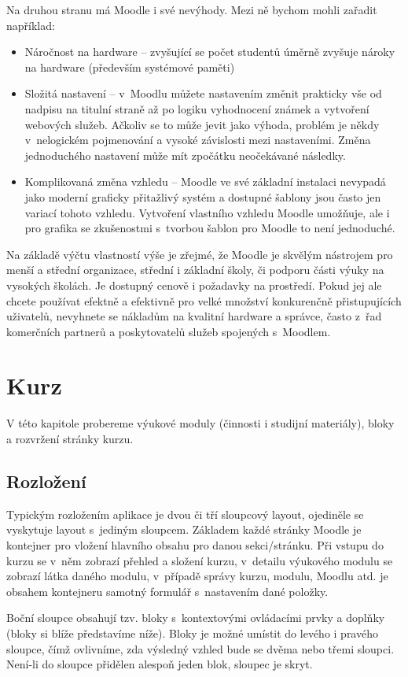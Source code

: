 \documentclass[
print,
  11pt,
  table,   
  nolof,    
  nolot,
  oneside,
  draft
]{fithesis3}
\begin{document}
Na druhou stranu má Moodle i své nevýhody. Mezi ně bychom mohli zařadit například:
\begin{itemize}
\item Náročnost na hardware -- zvyšující se počet studentů úměrně zvyšuje nároky na hardware (především systémové paměti)
\item Složitá nastavení -- v~Moodlu můžete nastavením změnit prakticky vše od nadpisu na titulní straně až po logiku vyhodnocení známek a vytvoření webových služeb. Ačkoliv se to může jevit jako výhoda, problém je někdy v~nelogickém pojmenování a vysoké závislosti me\-zi nastaveními. Změna jednoduchého nastavení může mít zpočátku neočekávané následky.
\item Komplikovaná změna vzhledu -- Moodle ve své základní instalaci nevypadá jako moderní graficky přitažlivý systém a dostupné šablony jsou často jen variací tohoto vzhledu. Vytvoření vlastního vzhledu Moodle umožňuje, ale i pro grafika se zkušenostmi s~tvorbou šablon pro Moodle to není jednoduché.
\end{itemize}

Na základě výčtu vlastností výše je zřejmé, že Moodle je skvělým nástrojem pro menší a střední organizace, střední i základní školy, či podporu části výuky na vysokých školách. Je dostupný cenově i požadavky na prostředí. Pokud jej ale chcete používat efektně a efektivně pro velké množství konkurenčně přistupujících uživatelů, nevyhnete se nákladům na kvalitní hardware a správce, často z~řad komerčních partnerů a poskytovatelů služeb spojených s~Moodlem. 

	\section{Kurz}
V této kapitole probereme výukové moduly (činnosti i studijní materiály), bloky a rozvržení stránky kurzu.  
		\subsection{Rozložení}
Typickým rozložením aplikace je dvou či tří sloupcový layout, ojediněle se vyskytuje layout s~jediným sloupcem. Základem každé stránky Moodle je kontejner pro vložení hlavního obsahu pro danou sekci/stránku. Při vstupu do kurzu se v~něm zobrazí přehled a složení kurzu, v~detailu výukového modulu se zobrazí látka daného modulu, v~případě správy kurzu, modulu, Moodlu atd. je obsahem kontejneru samotný formulář s~nastavením dané položky.

Boční sloupce obsahují tzv. bloky s~kontextovými ovládacími prvky a doplňky (bloky si blíže představíme níže). Bloky je možné umístit do levého i pravého sloupce, čímž ovlivníme, zda výsledný vzhled bude se dvěma nebo třemi sloupci. Není-li do sloupce přidělen alespoň jeden blok, sloupec je skryt. 
\end{document}
